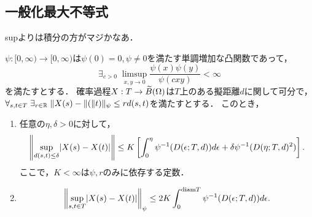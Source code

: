 \documentclass[uplatex,dvipdfmx]{jsreport}
\begin{document}
\subsection{一般化最大不等式}

\begin{tcolorbox}[colframe=ForestGreen, colback=ForestGreen!10!white,breakable,colbacktitle=ForestGreen!40!white,coltitle=black,fonttitle=\bfseries\sffamily,
title=]
    supよりは積分の方がマジかなあ．
\end{tcolorbox}

\begin{theorem}\label{thm-generalized-max-inequality}
    $\psi:[0,\infty)\to[0,\infty)$は$\psi(0)=0,\psi\ne 0$を満たす単調増加な凸関数であって，\[\exists_{c>0}\;\limsup_{x,y\to 0}\frac{\psi(x)\psi(y)}{\psi(cxy)}<\infty\]を満たすとする．
    確率過程$X:T\to\widetilde{B}(\Omega)$は$T$上のある擬距離$d$に関して可分で，$\forall_{s,t\in T}\;\exists_{r\in\mathbb{R}}\;\|X(s)-\|(\|t)\|_\psi\le rd(s,t)$を満たすとする．
    このとき，
    \begin{enumerate}
        \item 任意の$\eta,\delta>0$に対して，
        \[\left\|\sup_{d(s,t)\le\delta}\lvert X(s)-X(t)\rvert\right\|\le K\left[\int^\eta_0\psi^{-1}(D(\epsilon;T,d))d\epsilon+\delta\psi^{-1}(D(\eta;T,d)^2)\right].\]
        ここで，$K<\infty$は$\psi,r$のみに依存する定数．
        \item \[\left\|\sup_{s,t\in T}\lvert X(s)-X(t)\rvert\right\|_\psi\le 2K\int^{\mathrm{diam} T}_0\psi^{-1}(D(\epsilon;T,d))d\epsilon.\]
    \end{enumerate}
\end{theorem}
\end{document}
